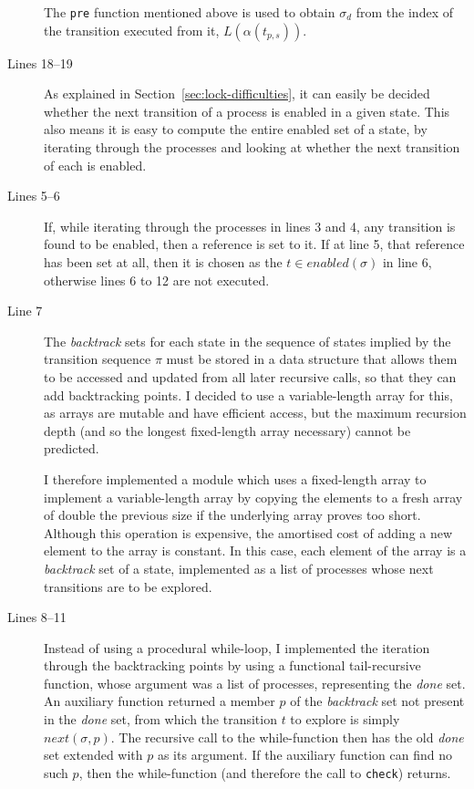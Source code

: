 \documentclass[12pt,a4paper,twoside,openright]{report}
\begin{document}
\begin{description}
	The \texttt{pre} function mentioned above is used to
	obtain $\sigma_d$ from the index of the
	transition executed from it, $L(\alpha(t_{p,s}))$.

	\item[Lines 18--19]	As explained in
	Section~\ref{sec:lock-difficulties}, it can
	easily be decided whether the next transition of
	a process is enabled in a given state. This also
	means it is easy to compute the entire enabled
	set of a state, by iterating through the processes
	and looking at whether the next transition of each
	is enabled.

	\item[Lines 5--6] If, while iterating through the
	processes in lines 3 and 4, any transition is found to be
	enabled, then a reference is set to it. If at line 5,
	that reference has been set at all, then it is chosen
	as the $t \in \textit{enabled}(\sigma)$ in line 6,
	otherwise lines 6 to 12 are not executed.

	\item[Line 7] The \textit{backtrack} sets for each state
	in the sequence of states implied by the transition
	sequence $\pi$ must be stored in a data structure that
	allows them to be accessed and updated from all later
	recursive calls, so that they can add backtracking
	points. I decided to use a variable-length array
	for this, as arrays are mutable and have efficient
	access, but the maximum recursion depth (and so the
	longest fixed-length array necessary) cannot be predicted.
	
	I therefore implemented a module which uses a fixed-length
	array to implement a variable-length array by
	copying the elements to a fresh array of double the
	previous size if the underlying array proves too short.
	Although this operation is expensive, the amortised
	cost of adding a new element to the array is constant.
	In this case, each element of the array is a \textit{backtrack}
	set of a state, implemented as a list of processes
	whose next transitions are to be explored.
	
	\item[Lines 8--11] Instead of using a
	procedural while-loop,
	I implemented the iteration through
	the backtracking points
	by using a functional tail-recursive
	function, whose argument
	was a list of processes, representing
	the \textit{done} set. An auxiliary
	function returned a member $p$ of the
	\textit{backtrack} set not present in the
	\textit{done} set, from which the
	transition $t$ to explore is simply
	$\textit{next}(\sigma, p)$. The
	recursive call to the while-function
	then has the old \textit{done} set
	extended with $p$ as its argument. If
	the auxiliary function can
	find no such $p$, then the
	while-function (and therefore the
	call to \texttt{check}) returns.


\end{description}
\end{document}
